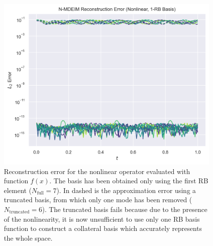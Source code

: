 \documentclass[../../thesis.tex]{subfiles}
\begin{document}
\begin{figure}[h]
    \includegraphics[width=\columnwidth]{research_project/piston/figures/svd_fourier/trilinear_nonlinear/rb_basis_mdeim_errors_nonlinear_num_1.png}
    \caption{Reconstruction error for the nonlinear operator evaluated with function $f(x)$.
    The basis has been obtained only using the first RB element ($N_{\text{full}}=7$).
    In dashed is the approximation error using a truncated basis, 
    from which only one mode has been removed ($N_{\text{truncated}}=6$). 
    The truncated basis fails because due to the presence of the nonlinearity, 
    it is now unsufficient to use only one RB basis function 
    to construct a collateral basis which accurately represents the whole space.}
    \label{fig:appendix_rb_nonlinear_num_1}
\end{figure}
\end{document}
